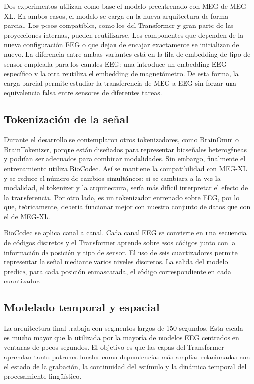 Dos experimentos utilizan como base el modelo preentrenado con MEG de MEG-XL. En ambos casos, el modelo se carga en la nueva arquitectura de forma parcial. Los pesos compatibles, como los del Transformer y gran parte de las proyecciones internas, pueden reutilizarse. Los componentes que dependen de la nueva configuración EEG o que dejan de encajar exactamente se inicializan de nuevo. La diferencia entre ambas variantes está en la fila de embedding de tipo de sensor empleada para los canales EEG: una introduce un embedding EEG específico y la otra reutiliza el embedding de magnetómetro. De esta forma, la carga parcial permite estudiar la transferencia de MEG a EEG sin forzar una equivalencia falsa entre sensores de diferentes tareas.



\subsection{Tokenización de la señal}

Durante el desarrollo se contemplaron otros tokenizadores, como BrainOmni o BrainTokenizer, porque están diseñados para representar bioseñales heterogéneas y podrían ser adecuados para combinar modalidades. Sin embargo, finalmente el entrenamiento utiliza BioCodec. Así se mantiene la compatibilidad con MEG-XL y se reduce el número de cambios simultáneos: si se cambiara a la vez la modalidad, el tokenizer y la arquitectura, sería más difícil interpretar el efecto de la transferencia. Por otro lado, es un tokenizador entrenado sobre EEG, por lo que, teóricamente, debería funcionar mejor con nuestro conjunto de datos que con el de MEG-XL.

BioCodec se aplica canal a canal. Cada canal EEG se convierte en una secuencia de códigos discretos y el Transformer aprende sobre esos códigos junto con la información de posición y tipo de sensor. El uso de seis cuantizadores permite representar la señal mediante varios niveles discretos. La salida del modelo predice, para cada posición enmascarada, el código correspondiente en cada cuantizador.

\subsection{Modelado temporal y espacial}

La arquitectura final trabaja con segmentos largos de 150 segundos. Esta escala es mucho mayor que la utilizada por la mayoría de modelos EEG centrados en ventanas de pocos segundos. El objetivo es que las capas del Transformer aprendan tanto patrones locales como dependencias más amplias relacionadas con el estado de la grabación, la continuidad del estímulo y la dinámica temporal del procesamiento lingüístico.

